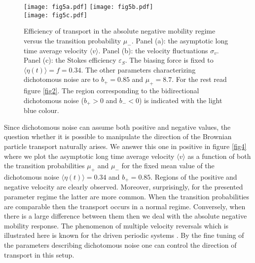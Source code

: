 \documentclass[12pt]{iopart}
\begin{document}
\begin{figure}[t]
	\centering
	\texttt{[image: fig5a.pdf]}
	\texttt{[image: fig5b.pdf]}\\
	\texttt{[image: fig5c.pdf]}
	\caption{Efficiency of transport in the absolute negative mobility regime versus the transition probability $\mu_-$. Panel (a): the asymptotic long time average velocity $\langle v \rangle$. Panel (b): the velocity fluctuations $\sigma_v$. Panel (c): the Stokes efficiency $\varepsilon_S$. The biasing force is fixed to $\langle \eta(t) \rangle = f = 0.34$. The other parameters characterizing dichotomous noise are to $b_+ = 0.85$ and $\mu_+ = 8.7$. For the rest read figure \ref{fig2}. The region corresponding to the bidirectional dichotomous noise ($b_+ > 0$ and $b_- < 0$) is indicated with the light blue colour.}
	\label{fig5}
\end{figure}
Since dichotomous noise can assume both positive and negative values, the question whether it is possible to manipulate the direction of the Brownian particle transport naturally arises. We answer this one in positive in figure \ref{fig4} where we plot the asymptotic long time average velocity $\langle v \rangle$ as a function of both the transition probabilities 
$\mu_+$ and $\mu_-$ for the fixed mean value of the dichotomous noise $\langle \eta(t) \rangle = 0.34$ and $b_+ = 0.85$. Regions of the positive and negative velocity are clearly observed. Moreover, surprisingly, for the presented parameter regime the latter are more common. When the transition 
probabilities are comparable then the transport occurs in a normal regime. Conversely, when there is a large difference between them then we deal with the absolute negative mobility response. The phenomenon of multiple velocity reversals 
which is illustrated here is known for the driven periodic systems \cite{spiechPRB, bartussek1994, jung1996, mateos2000}. By the fine tuning of the parameters describing  dichotomous noise one can control the direction of transport in this setup.
\end{document}
